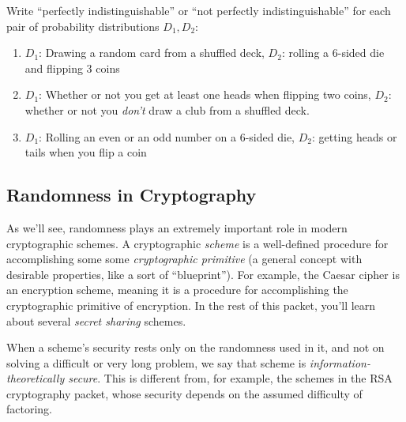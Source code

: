 
\begin{exercise}
    Write ``perfectly indistinguishable'' or ``not perfectly indistinguishable''
    for each pair of probability distributions $D_1, D_2$:
    \renewcommand{\labelenumi}{(\alph{enumi})} 
    \begin{enumerate}
        \item $D_1$: Drawing a random card from a shuffled deck, 
        $D_2$: rolling a 6-sided die and flipping 3 coins
        \item $D_1$: Whether or not you get at least one heads when flipping
        two coins, $D_2$: whether or not you \emph{don't} draw a club from a shuffled 
        deck.
        \item $D_1$: Rolling an even or an odd number on a 6-sided die, 
        $D_2$: getting heads or tails when you flip a coin
    \end{enumerate}
\end{exercise}

\subsection{Randomness in Cryptography}

As we'll see, randomness plays an extremely important role in modern cryptographic
schemes. A cryptographic \emph{scheme} is a well-defined procedure for accomplishing 
some some \emph{cryptographic primitive} (a general concept with desirable properties, like a sort of ``blueprint''). For example, the Caesar 
cipher is an encryption scheme\footnotemark, meaning it is a procedure for accomplishing
the cryptographic primitive of encryption. 
In the rest of this packet, you'll learn about several \emph{secret sharing} schemes.

When a scheme's security rests only on the randomness used in it, and not on 
solving a difficult or very long problem, we say that scheme is
\emph{information-theoretically secure}. This is different from, for example,
the schemes in the RSA cryptography packet, whose security depends on 
the assumed difficulty of factoring\footnotemark.

